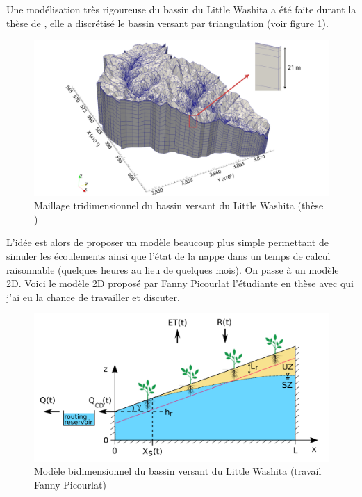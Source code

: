 \documentclass[a4paper,11pt]{article}
\numberwithin{equation}{section}
\begin{document}
Une modélisation très rigoureuse du bassin du Little Washita a été faite durant la thèse de \cite{maquin2016developpement}, elle a discrétisé le bassin versant par triangulation (voir figure \ref{fig-Little Washita 3D}).

\begin{figure}[H]
	\centering\includegraphics[scale=0.2]{images/little_washita3D.png}
	\caption{Maillage tridimensionnel du bassin versant du Little Washita (thèse \cite{maquin2016developpement})}
	\label{fig-Little Washita 3D}
\end{figure}

L'idée est alors de proposer un modèle beaucoup plus simple permettant de simuler les écoulements ainsi que l'état de la nappe dans un temps de calcul raisonnable (quelques heures au lieu de quelques mois). On passe à un modèle 2D. Voici le modèle 2D proposé par Fanny Picourlat l'étudiante en thèse avec qui j'ai eu la chance de travailler et discuter. 

\begin{figure}[H]
	\centering\includegraphics[scale=0.2]{images/upscaling_Little_Washita2D.png}
	\caption{Modèle bidimensionnel du bassin versant du Little Washita (travail Fanny Picourlat)}
	\label{fig-Little Washita 2D}
\end{figure}
\end{document}
